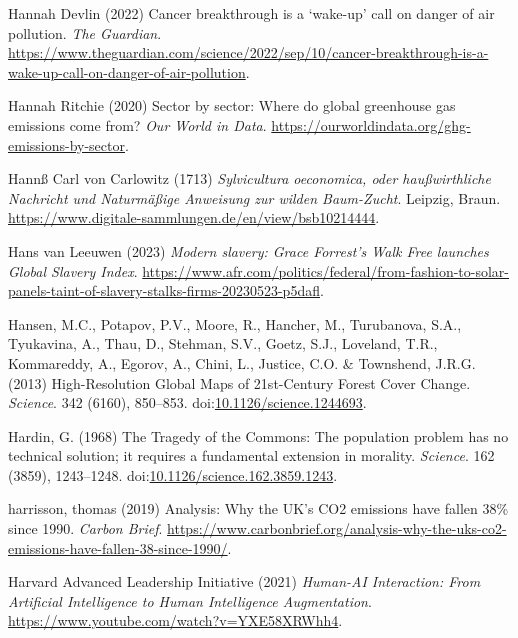 \documentclass[
  letterpaper,
  DIV=11,
  numbers=noendperiod]{scrartcl}
\newlength{\cslhangindent}
\newenvironment{CSLReferences}[2] %
 {\begin{list}{}{%
  \setlength{\itemindent}{0pt}
  \setlength{\leftmargin}{0pt}
  \setlength{\parsep}{0pt}
  \ifodd #1
   \setlength{\leftmargin}{\cslhangindent}
   \setlength{\itemindent}{-1\cslhangindent}
  \fi
  \setlength{\itemsep}{#2\baselineskip}}}
 {\end{list}}
\begin{document}
\begin{CSLReferences}{0}{1}
Hannah Devlin (2022) Cancer breakthrough is a {`wake-up'} call on danger
of air pollution. \emph{The Guardian}.
\url{https://www.theguardian.com/science/2022/sep/10/cancer-breakthrough-is-a-wake-up-call-on-danger-of-air-pollution}.

Hannah Ritchie (2020) Sector by sector: Where do global greenhouse gas
emissions come from? \emph{Our World in Data}.
\url{https://ourworldindata.org/ghg-emissions-by-sector}.

Hannß Carl von Carlowitz (1713) \emph{{Sylvicultura oeconomica, oder
hau{ß}wirthliche Nachricht und Naturm{ä}{ß}ige Anweisung zur wilden
Baum-Zucht}}. Leipzig, Braun.
\url{https://www.digitale-sammlungen.de/en/view/bsb10214444}.

Hans van Leeuwen (2023) \emph{Modern slavery: {Grace Forrest}'s {Walk
Free} launches {Global Slavery Index}}.
\url{https://www.afr.com/politics/federal/from-fashion-to-solar-panels-taint-of-slavery-stalks-firms-20230523-p5dafl}.

Hansen, M.C., Potapov, P.V., Moore, R., Hancher, M., Turubanova, S.A.,
Tyukavina, A., Thau, D., Stehman, S.V., Goetz, S.J., Loveland, T.R.,
Kommareddy, A., Egorov, A., Chini, L., Justice, C.O. \& Townshend,
J.R.G. (2013) High-{Resolution Global Maps} of 21st-{Century Forest
Cover Change}. \emph{Science}. 342 (6160), 850--853.
doi:\href{https://doi.org/10.1126/science.1244693}{10.1126/science.1244693}.

Hardin, G. (1968) The {Tragedy} of the {Commons}: {The} population
problem has no technical solution; it requires a fundamental extension
in morality. \emph{Science}. 162 (3859), 1243--1248.
doi:\href{https://doi.org/10.1126/science.162.3859.1243}{10.1126/science.162.3859.1243}.

harrisson, thomas (2019) Analysis: {Why} the {UK}'s {CO2} emissions have
fallen 38\% since 1990. \emph{Carbon Brief}.
\url{https://www.carbonbrief.org/analysis-why-the-uks-co2-emissions-have-fallen-38-since-1990/}.

Harvard Advanced Leadership Initiative (2021) \emph{Human-{AI
Interaction}: {From Artificial Intelligence} to {Human Intelligence
Augmentation}}. \url{https://www.youtube.com/watch?v=YXE58XRWhh4}.


\end{CSLReferences}
\end{document}
